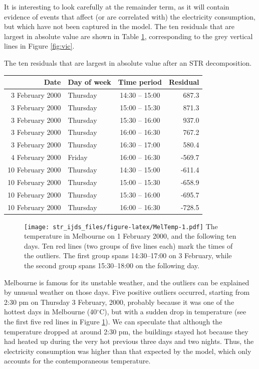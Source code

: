 \documentclass[ijds,nonblindrev]{informs-ijds}
\begin{document}
It is interesting to look carefully at the remainder term, as it will contain evidence of events that affect (or are correlated with) the electricity consumption, but which have not been captured in the model. The ten residuals that are largest in absolute value are shown in Table \ref{tab:outlierstable}, corresponding to the grey vertical lines in Figure \ref{fig:vic}.

\begin{table}\TABLE
{\label{tab:outlierstable}The ten residuals that are largest in absolute value after an STR decomposition.}
{\begin{tabular}[t]{rlcr}
\toprule
Date & Day of week & Time period & Residual\\
\midrule
3 February 2000 & Thursday & 14:30 -- 15:00 & 687.3\\
3 February 2000 & Thursday & 15:00 -- 15:30 & 871.3\\
3 February 2000 & Thursday & 15:30 -- 16:00 & 937.0\\
3 February 2000 & Thursday & 16:00 -- 16:30 & 767.2\\
3 February 2000 & Thursday & 16:30 -- 17:00 & 580.4\\

4 February 2000 & Friday & 16:00 -- 16:30 & -569.7\\
10 February 2000 & Thursday & 14:30 -- 15:00 & -611.4\\
10 February 2000 & Thursday & 15:00 -- 15:30 & -658.9\\
10 February 2000 & Thursday & 15:30 -- 16:00 & -695.7\\
10 February 2000 & Thursday & 16:00 -- 16:30 & -728.5\\
\bottomrule
\end{tabular}}
{}
\end{table}

\begin{figure}\FIGURE
{\texttt{[image: str\_ijds\_files/figure-latex/MelTemp-1.pdf]}}
{{\label{fig:MelTemp}The temperature in Melbourne on 1 February 2000, and the following ten days. Ten red lines (two groups of five lines each) mark the times of the outliers. The first group spans 14:30--17:00 on 3 February, while the second group spans 15:30--18:00 on the following day.}}
{}
\end{figure}

Melbourne is famous for its unstable weather, and the outliers can be explained by unusual weather on those days.
Five positive outliers occurred, starting from 2:30 pm on Thursday 3 February, 2000, probably because it was one of the hottest days in Melbourne (40\(^{\circ}\)C), but with a sudden drop in temperature (see the first five red lines in Figure \ref{fig:MelTemp}). We can speculate that although the temperature dropped at around 2:30 pm, the buildings stayed hot because they had heated up during the very hot previous three days and two nights. Thus, the electricity consumption was higher than that expected by the model, which only accounts for the contemporaneous temperature.
\end{document}
